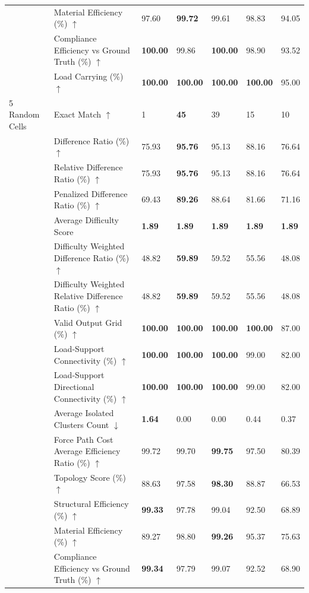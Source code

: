 \begin{table}[!h]
{\begin{tabular}{lllllll}
 & Material Efficiency (\%) $\uparrow$ & 97.60 & \textbf{99.72} & 99.61 & 98.83 & 94.05 \\
 & Compliance Efficiency vs Ground Truth (\%) $\uparrow$ & \textbf{100.00} & 99.86 & \textbf{100.00} & 98.90 & 93.52 \\
 & Load Carrying (\%) $\uparrow$ & \textbf{100.00} & \textbf{100.00} & \textbf{100.00} & \textbf{100.00} & 95.00 \\
5 Random Cells & Exact Match $\uparrow$ & 1 & \textbf{45} & 39 & 15 & 10 \\
 & Difference Ratio (\%) $\uparrow$ & 75.93 & \textbf{95.76} & 95.13 & 88.16 & 76.64 \\
 & Relative Difference Ratio (\%) $\uparrow$ & 75.93 & \textbf{95.76} & 95.13 & 88.16 & 76.64 \\
 & Penalized Difference Ratio (\%) $\uparrow$ & 69.43 & \textbf{89.26} & 88.64 & 81.66 & 71.16 \\
 & Average Difficulty Score & \textbf{1.89} & \textbf{1.89} & \textbf{1.89} & \textbf{1.89} & \textbf{1.89} \\
 & Difficulty Weighted Difference Ratio (\%) $\uparrow$ & 48.82 & \textbf{59.89} & 59.52 & 55.56 & 48.08 \\
 & Difficulty Weighted Relative Difference Ratio (\%) $\uparrow$ & 48.82 & \textbf{59.89} & 59.52 & 55.56 & 48.08 \\
 & Valid Output Grid (\%) $\uparrow$ & \textbf{100.00} & \textbf{100.00} & \textbf{100.00} & \textbf{100.00} & 87.00 \\
 & Load-Support Connectivity (\%) $\uparrow$ & \textbf{100.00} & \textbf{100.00} & \textbf{100.00} & 99.00 & 82.00 \\
 & Load-Support Directional Connectivity (\%) $\uparrow$ & \textbf{100.00} & \textbf{100.00} & \textbf{100.00} & 99.00 & 82.00 \\
 & Average Isolated Clusters Count $\downarrow$ & \textbf{1.64} & 0.00 & 0.00 & 0.44 & 0.37 \\
 & Force Path Cost Average Efficiency Ratio (\%) $\uparrow$ & 99.72 & 99.70 & \textbf{99.75} & 97.50 & 80.39 \\
 & Topology Score (\%) $\uparrow$ & 88.63 & 97.58 & \textbf{98.30} & 88.87 & 66.53 \\
 & Structural Efficiency (\%) $\uparrow$ & \textbf{99.33} & 97.78 & 99.04 & 92.50 & 68.89 \\
 & Material Efficiency (\%) $\uparrow$ & 89.27 & 98.80 & \textbf{99.26} & 95.37 & 75.63 \\
 & Compliance Efficiency vs Ground Truth (\%) $\uparrow$ & \textbf{99.34} & 97.79 & 99.07 & 92.52 & 68.90 \\

\end{tabular}}
\end{table}
